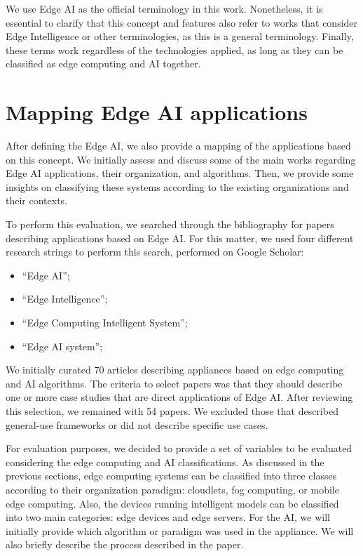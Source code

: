 We use Edge AI as the official terminology in this work. Nonetheless, it is essential to clarify that this concept and features also refer to works that consider Edge Intelligence or other terminologies, as this is a general terminology. Finally, these terms work regardless of the technologies applied, as long as they can be classified as edge computing and AI together.

\section{Mapping Edge AI applications}
\label{sec:mapping}

After defining the Edge AI, we also provide a mapping of the applications based on this concept. We initially assess and discuss some of the main works regarding Edge AI applications, their organization, and algorithms. Then, we provide some insights on classifying these systems according to the existing organizations and their contexts.

To perform this evaluation, we searched through the bibliography for papers describing applications based on Edge AI. For this matter, we used four different research strings to perform this search, performed on Google Scholar:

\begin{itemize}
    \item ``Edge AI'';
    \item ``Edge Intelligence'';
    \item ``Edge Computing Intelligent System'';
    \item ``Edge AI system'';
\end{itemize}

We initially curated 70 articles describing appliances based on edge computing and AI algorithms. The criteria to select papers was that they should describe one or more case studies that are direct applications of Edge AI. After reviewing this selection, we remained with 54 papers. We excluded those that described general-use frameworks or did not describe specific use cases.

For evaluation purposes, we decided to provide a set of variables to be evaluated considering the edge computing and AI classifications. As discussed in the previous sections, edge computing systems can be classified into three classes according to their organization paradigm: cloudlets, fog computing, or mobile edge computing. Also, the devices running intelligent models can be classified into two main categories: edge devices and edge servers. For the AI, we will initially provide which algorithm or paradigm was used in the appliance. We will also briefly describe the process described in the paper.


